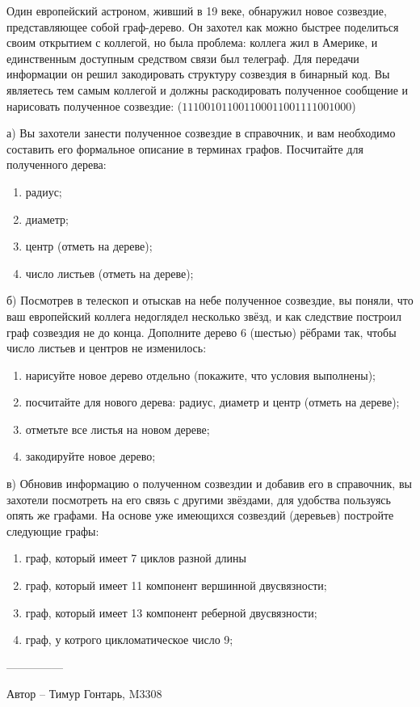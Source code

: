 \question
Один европейский астроном, живший в 19 веке, обнаружил новое созвездие, представляющее собой граф-дерево. Он захотел как можно быстрее поделиться своим открытием с коллегой, но была проблема: коллега жил в Америке, и единственным доступным средством связи был телеграф. Для передачи информации он решил закодировать структуру созвездия в бинарный код. Вы являетесь тем самым коллегой и должны раскодировать полученное сообщение и нарисовать полученное созвездие: ($111001011001100011001111001000$)

а) Вы захотели занести полученное созвездие в справочник, и вам необходимо составить его формальное описание в терминах графов. Посчитайте для полученного дерева:
\begin{enumerate}
\item радиус;
\item диаметр;
\item центр (отметь на дереве);
\item число листьев (отметь на дереве);
\end{enumerate}

б) Посмотрев в телескоп и отыскав на небе полученное созвездие, вы поняли, что ваш европейский коллега недоглядел несколько звёзд, и как следствие построил граф созвездия не до конца. Дополните дерево 6 (шестью) рёбрами так, чтобы число листьев и центров не изменилось:
\begin{enumerate}
\item нарисуйте новое дерево отдельно (покажите, что условия выполнены);
\item посчитайте для нового дерева: радиус, диаметр и центр (отметь на дереве);
\item отметьте все листья на новом дереве;
\item закодируйте новое дерево;
\end{enumerate}

в) Обновив информацию о полученном созвездии и добавив его в справочник, вы захотели посмотреть на его связь с другими звёздами, для удобства пользуясь опять же графами. На основе уже имеющихся созвездий (деревьев) постройте следующие графы:
\begin{enumerate}
\item граф, который имеет 7 циклов разной длины
\item граф, который имеет 11 компонент вершинной двусвязности;
\item граф, который имеет 13 компонент реберной двусвязности;
\item граф, у котрого цикломатическое число 9;
\end{enumerate}

---------------

Автор -- Тимур Гонтарь, M3308
